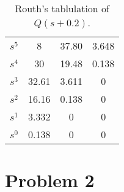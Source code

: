 \documentclass[10pt,a4paper]{article}
\begin{document}
        \begin{table}[h!]
            \centering
            \begin{tabular}{ c | c c c}
                $s^5$ & 8     & 37.80 & 3.648 \\
                $s^4$ & 30    & 19.48 & 0.138 \\
                $s^3$ & 32.61 & 3.611 & 0  \\
                $s^2$ & 16.16 & 0.138 & 0  \\
                $s^1$ & 3.332 & 0     & 0  \\
                $s^0$ & 0.138 & 0     & 0             
            \end{tabular}
            \caption{Routh's tablulation of $Q(s + 0.2)$.}
            \label{tb:rouths_Qc}
            \end{table}

        \section{Problem 2}
        
    \printbibliography
\end{document}
